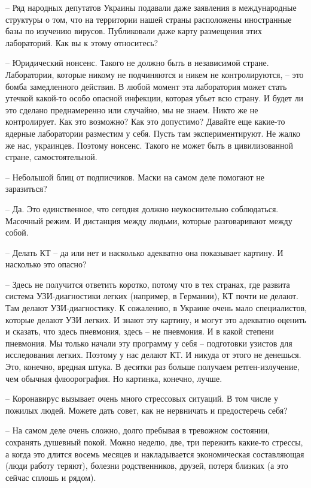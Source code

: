 – Ряд народных депутатов Украины подавали даже заявления в международные
структуры о том, что на территории нашей страны расположены иностранные базы по
изучению вирусов. Публиковали даже карту размещения этих лабораторий. Как вы к
этому относитесь? 

– Юридический нонсенс. Такого не должно быть в независимой стране. Лаборатории,
которые никому не подчиняются и никем не контролируются, – это бомба
замедленного действия. В любой момент эта лаборатория может стать утечкой
какой-то особо опасной инфекции, которая убьет всю страну. И будет ли это
сделано преднамеренно или случайно, мы не знаем. Никто же не контролирует. Как
это возможно? Как это допустимо? Давайте еще какие-то ядерные лаборатории
разместим у себя. Пусть там экспериментируют. Не жалко же нас, украинцев.
Поэтому нонсенс. Такого не может быть в цивилизованной стране, самостоятельной. 

– Небольшой блиц от подписчиков. Маски на самом деле помогают не заразиться?

– Да. Это единственное, что сегодня должно неукоснительно соблюдаться. Масочный
режим. И дистанция между людьми, которые разговаривают между собой. 

– Делать КТ – да или нет и насколько адекватно она показывает картину. И
насколько это опасно?

– Здесь не получится ответить коротко, потому что в тех странах, где развита
система УЗИ-диагностики легких (например, в Германии), КТ почти не делают. Там
делают УЗИ-диагностику. К сожалению, в Украине очень мало специалистов, которые
делают УЗИ легких. И знают эту картину, и могут это адекватно оценить и
сказать, что здесь пневмония, здесь – не пневмония. И в какой степени
пневмония. Мы только начали эту программу у себя – подготовки узистов для
исследования легких. Поэтому у нас делают КТ. И никуда от этого не денешься.
Это, конечно, вредная штука. В десятки раз больше получаем ретген-излучение,
чем обычная флюорография. Но картинка, конечно, лучше.

– Коронавирус вызывает очень много стрессовых ситуаций. В том числе у пожилых
людей. Можете дать совет, как не нервничать и предостеречь себя?

– На самом деле очень сложно, долго пребывая в тревожном состоянии, сохранять
душевный покой. Можно неделю, две, три пережить какие-то стрессы, а когда это
длится восемь месяцев и накладывается экономическая составляющая (люди работу
теряют), болезни родственников, друзей, потеря близких (а это сейчас сплошь и
рядом).

